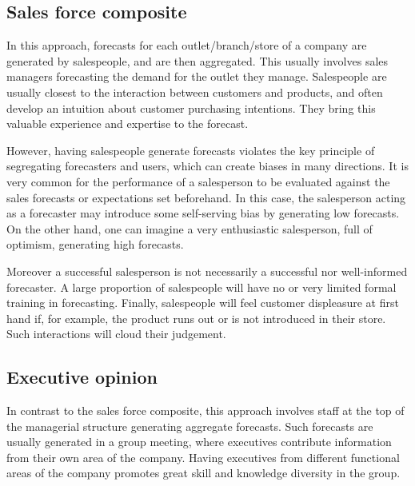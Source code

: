 \documentclass[]{book}
\begin{document}
\hypertarget{sales-force-composite}{%
\subsection*{Sales force composite}\label{sales-force-composite}}

In this approach, forecasts for each outlet/branch/store of a company are generated by salespeople, and are then aggregated. This usually involves sales managers forecasting the demand for the outlet they manage. Salespeople are usually closest to the interaction between customers and products, and often develop an intuition about customer purchasing intentions. They bring this valuable experience and expertise to the forecast.

However, having salespeople generate forecasts violates the key principle of segregating forecasters and users, which can create biases in many directions. It is very common for the performance of a salesperson to be evaluated against the sales forecasts or expectations set beforehand. In this case, the salesperson acting as a forecaster may introduce some self-serving bias by generating low forecasts. On the other hand, one can imagine a very enthusiastic salesperson, full of optimism, generating high forecasts.

Moreover a successful salesperson is not necessarily a successful nor well-informed forecaster. A large proportion of salespeople will have no or very limited formal training in forecasting. Finally, salespeople will feel customer displeasure at first hand if, for example, the product runs out or is not introduced in their store. Such interactions will cloud their judgement.

\hypertarget{executive-opinion}{%
\subsection*{Executive opinion}\label{executive-opinion}}

In contrast to the sales force composite, this approach involves staff at the top of the managerial structure generating aggregate forecasts. Such forecasts are usually generated in a group meeting, where executives contribute information from their own area of the company. Having executives from different functional areas of the company promotes great skill and knowledge diversity in the group.
\end{document}
